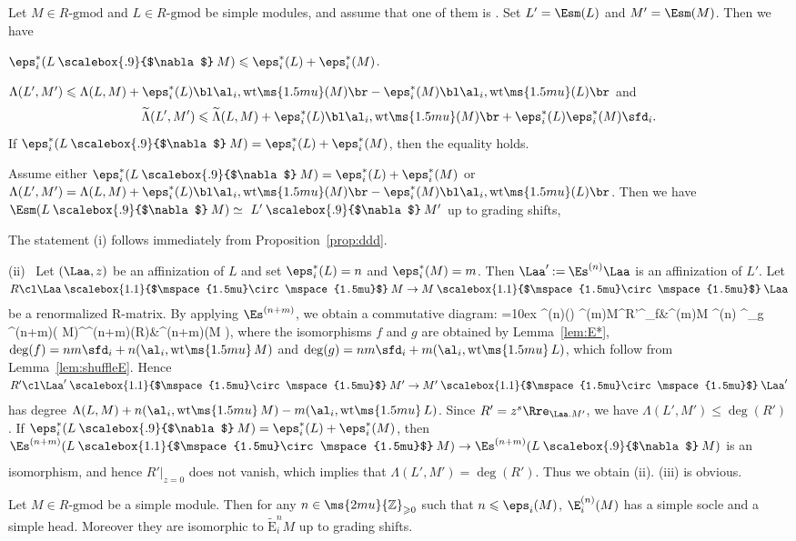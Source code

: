 \documentclass[12pt,leqno]{amsart}%
\renewcommand{\le}{\leqslant}
\renewcommand{\ge}{\geqslant}
\theoremstyle{plain}
\theoremstyle{definition}
\newcommand{\Z}{\ms{2mu}{\mathbb Z}}
\newcommand{\seteq}{\mathbin{:=}}
\newcommand{\gmod}{\text{-}\mathrm{gmod}}
\newcommand{\conv}[1][]{
\underset{\raisebox{.5ex}{$\scriptstyle{#1}$}}{\mathbin{\scalebox{1.1}{$\mspace{1.5mu}\circ\mspace{1.5mu}$}}}}
\newcommand{\hconv}{\mathbin{\scalebox{.9}{$\nabla$}}}
\newcommand{\wt}{\mathrm{wt}\ms{1.5mu}} 		%
\newcommand{\tE}{\widetilde{\mathrm{E}}} 		%
\newcommand{\La}{\Lambda} 			%
\newcommand{\tLa}{\widetilde{\Lambda}} 			%
\newcommand{\bnum}{\be[{\rm(i)}]}
\numberwithin{equation}{section}
\begin{document}
%

\Prop\label{prop:E*}
Let $M\in R\gmod$ and $L\in R\gmod$ be simple modules, and assume that one of them is \afr.
Set $L'=\Esm(L)$ and $M'=\Esm(M)$.
Then we have
\bnum
\item $\eps_{i}^*(L\hconv M)\le\eps_{i}^*(L)+\eps_{i}^*(M)$.
\item
$\La(L', M')\le\La(L,M)+\eps_{i}^*(L)\bl\al_{i},\wt(M)\br-\eps_{i}^*(M)\bl\al_{i},\wt(L)\br$
and $$\tLa(L', M')\le\tLa(L,M)+\eps_{i}^*(L)\bl\al_{i},\wt(M)\br
+\eps_{i}^*(L)\eps_{i}^*(M)\sfd_i.$$
If $\eps_{i}^*(L\hconv M)=\eps_{i}^*(L)+\eps_{i}^*(M)$, then the equality holds.
\item
Assume either 
$\eps_{i}^*(L\hconv M)=\eps_{i}^*(L)+\eps_{i}^*(M)$ or
$\La(L', M')=\La(L,M)+\eps_{i}^*(L)\bl\al_{i},\wt(M)\br-\eps_{i}^*(M)\bl\al_{i},\wt(L)\br$.
Then we have $\Esm(L\hconv M)\simeq\ L'\hconv M'$ up to grading shifts,
\ee
\enprop


\Proof
The statement (i) follows immediately from Proposition~\ref{prop:ddd}.

\snoi
(ii) \ 
Let $(\Laa,z)$ be an affinization of $L$ and set $\eps^*_i(L)=n$ and $\eps^*_i(M)=m$.
Then $\Laa'\seteq\Es^{(n)}\Laa$ is an affinization of $L'$.
Let $R\cl \Laa\conv M\to M\conv \Laa$ be
a renormalized R-matrix.
By applying $\Es^{(n+m)}$, we obtain a commutative diagram:
\eqn
\xymatrix@C=10ex{
\Es^{(n)}(\Laa)\conv\Es^{(m)}M\ar[r]^{R'}\ar[d]^\bwr_f&\Es^{(m)}M\conv\Es^{(n)}\Laa
\ar[d]^\bwr_g\\
\Es^{(n+m)}(\Laa\conv M)\ar[r]^{\Es^{(n+m)}(R)}&\Es^{(n+m)}(M\conv \Laa),
}
\eneqn
where the isomorphisms $f$ and $g$ are obtained by Lemma~\ref{lem:E*},  
$\deg(f)=nm\sfd_i+n(\al_i, \wt\,M)$
and $\deg(g)=nm\sfd_i+m(\al_i, \wt\,L)${, which follow from Lemma~\ref{lem:shuffleE}}.
Hence $R'\cl \Laa'\conv M'\to M'\conv \Laa'$ has degree
$\La(L,M)+n(\al_i, \wt\,M)-m(\al_i, \wt\,L)$.
Since $R'=z^s \Rre_{\Laa.M'}$, we have
$\La(L',M')\le\deg(R')$. If $\eps_{i}^*(L\hconv M)=\eps_{i}^*(L)+\eps_{i}^*(M)$, 
then $\Es^{(n+m)}(L\conv M)\to\Es^{(n+m)}(L\hconv M)$ is an isomorphism, and hence
$R'\vert_{z=0}$ does not vanish, which implies that $\La(L',M')=\deg(R')$.
Thus we obtain (ii). (iii) is obvious. 
\QED



\Lemma[{\cite[Lemma 3.13]{KL09}}]
Let $M\in R\gmod$ be a simple module.
Then for any $n\in\Z_{\ge0}$ such that $n\le\eps_i(M)$,
$\E_i^{(n)}(M)$ has a simple socle and a simple head.
Moreover they are isomorphic to $\tE_i^nM$ \ro up to grading shifts\rf.
\enlemma
\end{document}

